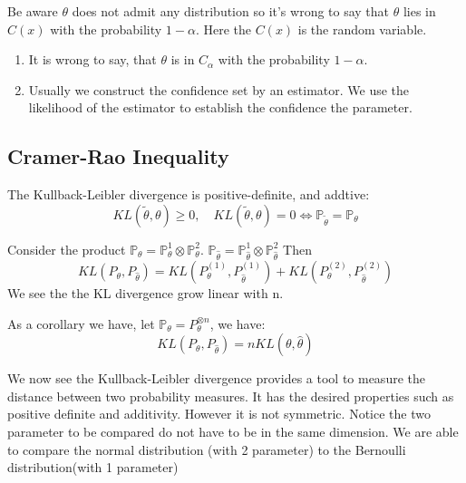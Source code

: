 \begin{remark}
Be aware $\theta$ does not admit any distribution so it's wrong to say that $\theta$ lies in $C(x)$ with the probability $1 - \alpha$. Here the $C(x)$ is the random variable.
\begin{enumerate}
    \item It is wrong to say, that $\theta$ is in $C_{\alpha}$ with the probability $1 - \alpha$.
    \item Usually we construct the confidence set by an estimator. We use the likelihood of the estimator to establish the confidence the parameter.
\end{enumerate}
\end{remark}



\subsection{Cramer-Rao Inequality}
\begin{lemma}
The Kullback-Leibler divergence is positive-definite, and addtive:
	\begin{equation*}
		KL(\tilde{\theta}, \theta) \geq 0, \quad		KL(\tilde{\theta}, \theta) = 0 \Leftrightarrow \mathbb{P}_{\tilde{\theta}} = \mathbb{P}_{\theta}
	\end{equation*}
\end{lemma}

\begin{lemma}[Additivity]
	Consider the product $\mathbb{P}_\theta = \mathbb{P}_\theta^{1} \otimes \mathbb{P}_\theta^{2}$. $\mathbb{P}_{\hat{\theta}} = \mathbb{P}_{\hat{\theta}}^1 \otimes \mathbb{P}_{\hat{\theta}}^2$  Then 
	\begin{equation}
		KL(P_\theta, P_{\hat{\theta}}) = KL(P_\theta^{(1)} , P_{\hat{\theta}}^{(1)}) + KL(P_\theta^{(2)} , P_{\hat{\theta}}^{(2)})
	\end{equation}
	We see the the KL divergence grow linear with n.
\end{lemma}

\begin{corollary}
	As a corollary we have, let $\mathbb{P}_\theta = P_\theta^{\otimes n}$, we have:
	\begin{equation}
		KL(P_\theta, P_{\hat{\theta}}) = nKL(\theta, \hat{\theta})
	\end{equation}
\end{corollary}

We now see the Kullback-Leibler divergence provides a tool to measure the distance between two probability measures. It has the desired properties such as positive definite and additivity. However it is not symmetric. Notice the two parameter to be compared do not have to be in the same dimension. We are able to compare the normal distribution (with 2 parameter) to the Bernoulli distribution(with 1 parameter)

